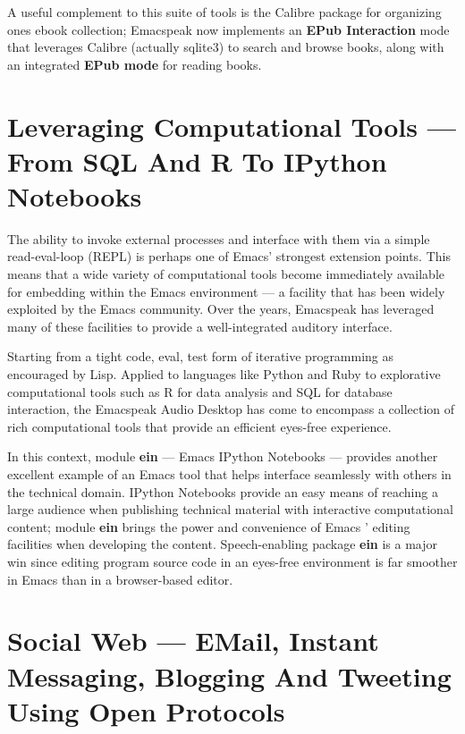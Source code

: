 \documentclass[11pt]{article}
\begin{document}
A useful complement to this suite of tools is the Calibre package
for organizing ones ebook collection; Emacspeak now implements an
\textbf{EPub Interaction} mode that leverages Calibre (actually sqlite3)
to search and browse books, along with an integrated \textbf{EPub mode}
for reading books.

\section{Leveraging Computational Tools —  From SQL And R To IPython Notebooks}
\label{sec-12}

The ability to invoke external processes and interface with them
via a simple read-eval-loop (REPL) is perhaps one of Emacs'
strongest extension points. This means that a wide variety of
computational tools become immediately available for embedding
within the Emacs environment — a facility that has been widely
exploited by the Emacs community. Over the years, Emacspeak has
leveraged many of these facilities to provide a well-integrated
auditory interface.

Starting from a tight code, eval, test form of iterative
programming as encouraged by Lisp. Applied to languages like
Python and Ruby to explorative computational tools such as R for
data analysis and SQL for database interaction, the Emacspeak
Audio Desktop has come to encompass a collection of rich
computational tools that provide an efficient eyes-free
experience.


In this context, module \textbf{ein} — Emacs IPython Notebooks —
provides another excellent example of an Emacs tool that helps
interface seamlessly with others in the technical domain. IPython
Notebooks provide an easy means of reaching a large audience when
publishing technical material with interactive computational
content; module \textbf{ein} brings the power and convenience of Emacs '
editing facilities when developing the content. Speech-enabling
package \textbf{ein} is a major win since editing program source code
in an eyes-free environment is far smoother in Emacs than in a
browser-based editor.

\section{Social Web  — EMail, Instant Messaging, Blogging  And Tweeting Using Open Protocols}
\label{sec-13}
\end{document}
